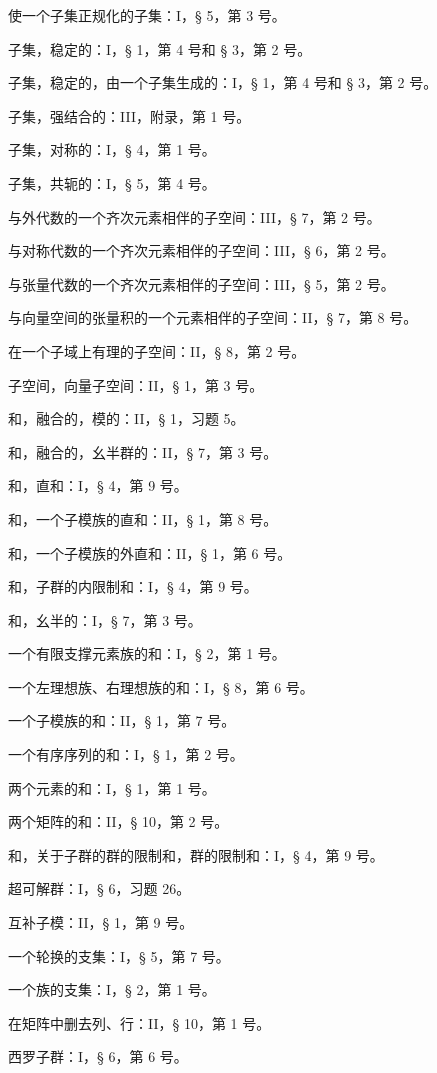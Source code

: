 使一个子集正规化的子集：I，§ 5，第 3 号。

子集，稳定的：I，§ 1，第 4 号和 § 3，第 2 号。

子集，稳定的，由一个子集生成的：I，§ 1，第 4 号和 § 3，第 2 号。

子集，强结合的：III，附录，第 1 号。

子集，对称的：I，§ 4，第 1 号。

子集，共轭的：I，§ 5，第 4 号。

与外代数的一个齐次元素相伴的子空间：III，§ 7，第 2 号。

与对称代数的一个齐次元素相伴的子空间：III，§ 6，第 2 号。

与张量代数的一个齐次元素相伴的子空间：III，§ 5，第 2 号。

与向量空间的张量积的一个元素相伴的子空间：II，§ 7，第 8 号。

在一个子域上有理的子空间：II，§ 8，第 2 号。

子空间，向量子空间：II，§ 1，第 3 号。

和，融合的，模的：II，§ 1，习题 5。

和，融合的，幺半群的：II，§ 7，第 3 号。

和，直和：I，§ 4，第 9 号。

和，一个子模族的直和：II，§ 1，第 8 号。

和，一个子模族的外直和：II，§ 1，第 6 号。

和，子群的内限制和：I，§ 4，第 9 号。

和，幺半的：I，§ 7，第 3 号。

一个有限支撑元素族的和：I，§ 2，第 1 号。

一个左理想族、右理想族的和：I，§ 8，第 6 号。

一个子模族的和：II，§ 1，第 7 号。

一个有序序列的和：I，§ 1，第 2 号。

两个元素的和：I，§ 1，第 1 号。

两个矩阵的和：II，§ 10，第 2 号。

和，关于子群的群的限制和，群的限制和：I，§ 4，第 9 号。

超可解群：I，§ 6，习题 26。

互补子模：II，§ 1，第 9 号。

一个轮换的支集：I，§ 5，第 7 号。

一个族的支集：I，§ 2，第 1 号。

在矩阵中删去列、行：II，§ 10，第 1 号。

西罗子群：I，§ 6，第 6 号。

